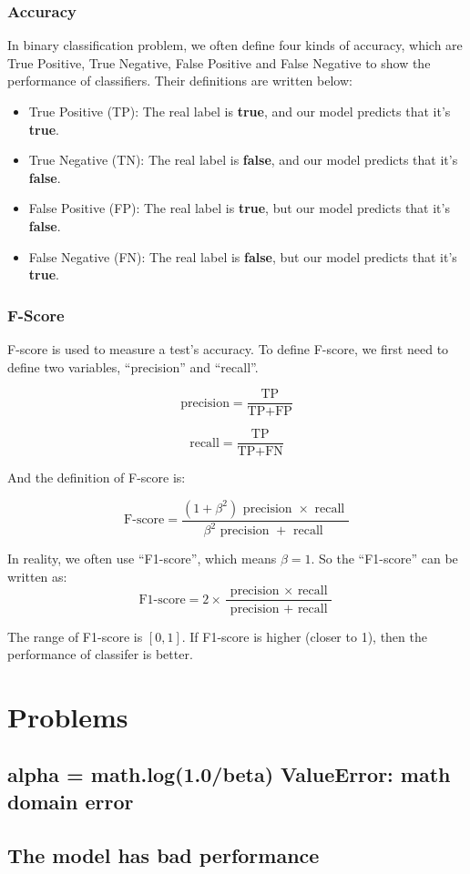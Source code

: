 \documentclass{article}[12pt]
\begin{document}
\subsubsection{Accuracy}
In binary classification problem, we often define four kinds of accuracy, 
which are True Positive, True Negative, False Positive and False Negative 
to show the performance of classifiers. Their definitions are written below:
\begin{itemize}
    \item True Positive (TP): The real label is \textbf{true}, 
    and our model predicts that it's \textbf{true}.
    \item True Negative (TN): The real label is \textbf{false}, 
    and our model predicts that it's \textbf{false}.
    \item False Positive (FP): The real label is \textbf{true}, 
    but our model predicts that it's \textbf{false}.
    \item False Negative (FN): The real label is \textbf{false}, 
    but our model predicts that it's \textbf{true}.
\end{itemize}
\subsubsection{F-Score}
F-score is used to measure a test's accuracy. 
To define F-score, we first need to define two variables, 
``precision'' and ``recall''.

\begin{equation}
    \text {precision}=\frac{\text{TP}}{\text{TP}+\text{FP}}
\end{equation}

\begin{equation}
    \text {recall}=\frac{\text{TP}}{\text{TP}+\text{FN}}
\end{equation}

And the definition of F-score is:

\begin{equation}
    \text {F-score}=\frac{\left(1+\beta^{2}\right) \text { precision } \times \text { recall }}{\beta^{2} \text { precision }+\text { recall }}
\end{equation}

In reality, we often use ``F1-score'', which means $\beta=1$. So the ``F1-score'' can be written as:
\begin{equation}
    \text {F1-score}=2 \times \frac{\text { precision } \times \text { recall }}{\text { precision }+\text { recall }}
\end{equation}

The range of F1-score is $[0, 1]$. If F1-score is higher (closer to 1), 
then the performance of classifer is better.

\section{Problems}
\subsection{alpha = math.log(1.0/beta) ValueError: math domain error}
\subsection{The model has bad performance}
\end{document}
